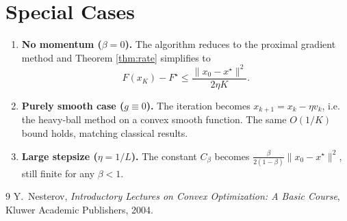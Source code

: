 \documentclass[11pt]{article}
\begin{document}
\section*{Special Cases}
\begin{enumerate}
  \item \textbf{No momentum ($\beta=0$).} The algorithm reduces to the proximal gradient method and Theorem \ref{thm:rate} simplifies to 
  \[
  F(x_{K})-F^\star\le \frac{\|x_0-x^\star\|^{2}}{2\eta K}.
  \]
  \item \textbf{Purely smooth case ($g\equiv0$).} The iteration becomes $x_{k+1}=x_k-\eta v_k$, i.e. the heavy‑ball method on a convex smooth function. The same $O(1/K)$ bound holds, matching classical results.
  \item \textbf{Large stepsize ($\eta=1/L$).} The constant $C_{\beta}$ becomes $\frac{\beta}{2(1-\beta)}\|x_0-x^\star\|^{2}$, still finite for any $\beta<1$.
\end{enumerate}

\begin{thebibliography}{9}
Y.~Nesterov, \emph{Introductory Lectures on Convex Optimization: A Basic Course}, Kluwer Academic Publishers, 2004.
\end{thebibliography}
\end{document}

